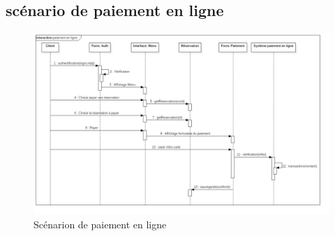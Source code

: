 \documentclass[12pt,a4paper]{report}
\begin{document}
			\subsection{scénario de paiement en ligne}
			\vspace{1cm}
			\begin{figure}[!hbtp]
				\centering
				\includegraphics[scale=0.35]{./graphics/paiement.jpg}
				\caption{Scénarion de paiement en ligne}
			\end{figure}

			\newpage
		

\end{document}
